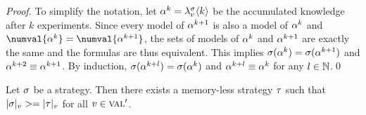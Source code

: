 \begin{proof}
To simplify the notation, let $\alpha^k = \lambda^{\sigma}_{v}\langle k\rangle$ be the accumulated knowledge after $k$ experiments.
Since every model of $\alpha^{k+1}$ is also a model of $\alpha^k$ and
  $\numval{\know^{k}} = \numval{\know^{k+1}}$, the sets of
  models of $\alpha^{k}$ and $\alpha^{k+1}$ are exactly the same
  and the formulas are thus equivalent.
This implies $\sigma(\alpha^{k}) = \sigma(\alpha^{k+1})$
  and $\alpha^{k+2} \equiv \alpha^{k+1}$.
By induction,
  $\sigma(\alpha^{k+l}) = \sigma(\alpha^{k})$ and
  $\alpha^{k+l} \equiv \alpha^{k}$
  for any $l\in\mathbb{N}$.\qed
\end{proof}

\begin{theorem} \label{th:memless}
Let $\sigma$ be a strategy.
Then there exists a memory-less strategy $\tau$ such that
  $|\sigma|_{v} >= |\tau|_{v}$ for all $v\in\textsc{val}'$.
\end{theorem}

